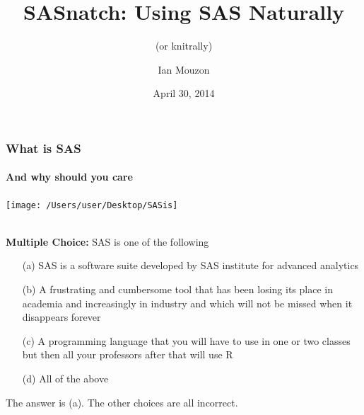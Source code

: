 \documentclass[xcolor=dvipsnames,gray,mathserif]{beamer}
\title[SASnatch]{SASnatch: Using SAS Naturally}
\subtitle{(or knitrally) \\
\smaller{(or snatchurally)}}
\author[Mouzon]{Ian Mouzon}
\institute[Stats@ISU]{STAT 585 Presentation\\Spring 2014}
\date[Apr 30, 2014]{April 30, 2014}
\begin{document}
%



\begin{frame}
\titlepage
\end{frame}

\begin{frame}
\frametitle{What is SAS}
\framesubtitle{And why should you care}
\centerline{\texttt{[image: /Users/user/Desktop/SASis]}} \\

\textbf{Multiple Choice:}
SAS is one of the following
\begin{itemize}
   \item[(a)] 
      SAS is a software suite developed by SAS institute for advanced analytics
   \item[(b)] 
      A frustrating and cumbersome tool that has been losing 
      its place in academia and increasingly in industry and which will not be
      missed when it disappears forever
   \item[(c)]
      A programming language that you will have to use in one or two classes
      but then all your professors after that will use R
   \item[(d)]
      All of the above
\end{itemize}
\pause The answer is (a). The other choices are all incorrect.
\end{frame}
\end{document}
